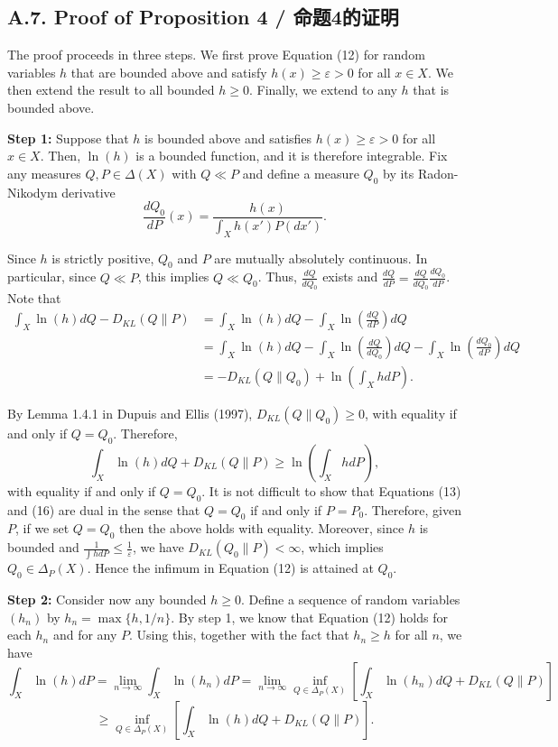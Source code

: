 \documentclass[12pt,a4paper]{article}
\newenvironment{original}
  {\par\noindent\color{black}\smallskip}
  {\par\smallskip}
\begin{document}
\subsection*{A.7. Proof of Proposition 4 / 命题4的证明}

\begin{original}
The proof proceeds in three steps. We first prove Equation (12) for random variables $h$ that are bounded above and satisfy $h(x) \geq \varepsilon > 0$ for all $x \in X$. We then extend the result to all bounded $h \geq 0$. Finally, we extend to any $h$ that is bounded above.

\textbf{Step 1:} Suppose that $h$ is bounded above and satisfies $h(x) \geq \varepsilon > 0$ for all $x \in X$. Then, $\ln(h)$ is a bounded function, and it is therefore integrable. Fix any measures $Q, P \in \Delta(X)$ with $Q \ll P$ and define a measure $Q_0$ by its Radon-Nikodym derivative
\[
\frac{dQ_0}{dP}(x) = \frac{h(x)}{\int_X h(x') P(dx')}.
\]

Since $h$ is strictly positive, $Q_0$ and $P$ are mutually absolutely continuous. In particular, since $Q \ll P$, this implies $Q \ll Q_0$. Thus, $\frac{dQ}{dQ_0}$ exists and $\frac{dQ}{dP} = \frac{dQ}{dQ_0} \frac{dQ_0}{dP}$. Note that
\begin{align*}
\int_X \ln(h) dQ - D_{KL}(Q\|P)
&= \int_X \ln(h) dQ - \int_X \ln\left( \frac{dQ}{dP} \right) dQ \\
&= \int_X \ln(h) dQ - \int_X \ln\left( \frac{dQ}{dQ_0} \right) dQ - \int_X \ln\left( \frac{dQ_0}{dP} \right) dQ \\
&= -D_{KL}(Q\|Q_0) + \ln\left( \int_X h dP \right).
\end{align*}

By Lemma 1.4.1 in Dupuis and Ellis (1997), $D_{KL}(Q\|Q_0) \geq 0$, with equality if and only if $Q = Q_0$. Therefore,
\[
\int_X \ln(h) dQ + D_{KL}(Q\|P) \geq \ln\left( \int_X h dP \right),
\]
with equality if and only if $Q = Q_0$. It is not difficult to show that Equations (13) and (16) are dual in the sense that $Q = Q_0$ if and only if $P = P_0$. Therefore, given $P$, if we set $Q = Q_0$ then the above holds with equality. Moreover, since $h$ is bounded and $\frac{1}{\int h dP} \leq \frac{1}{\varepsilon}$, we have $D_{KL}(Q_0\|P) < \infty$, which implies $Q_0 \in \Delta_P(X)$. Hence the infimum in Equation (12) is attained at $Q_0$.

\textbf{Step 2:} Consider now any bounded $h \geq 0$. Define a sequence of random variables $(h_n)$ by $h_n = \max\{h, 1/n\}$. By step 1, we know that Equation (12) holds for each $h_n$ and for any $P$. Using this, together with the fact that $h_n \geq h$ for all $n$, we have
\[
\int_X \ln(h) dP = \lim_{n \to \infty} \int_X \ln(h_n) dP = \lim_{n \to \infty} \inf_{Q \in \Delta_P(X)} \left[ \int_X \ln(h_n) dQ + D_{KL}(Q\|P) \right]
\]
\[
\geq \inf_{Q \in \Delta_P(X)} \left[ \int_X \ln(h) dQ + D_{KL}(Q\|P) \right].
\]


\end{original}
\end{document}
